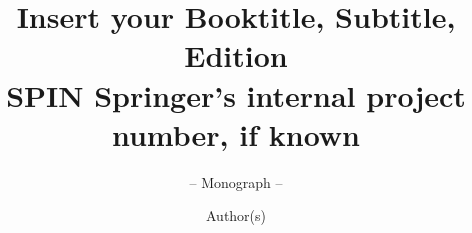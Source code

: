 \documentclass[envcountsame,envcountchap]{svmono}
\begin{document}
\author{Author(s)}
\title{Insert your Booktitle, Subtitle, Edition\\
{\small SPIN Springer's internal project number, if known}}
\subtitle{-- Monograph --}
\maketitle

\frontmatter%




\tableofcontents


\mainmatter%



%
%




\backmatter%


\printindex

\end{document}
